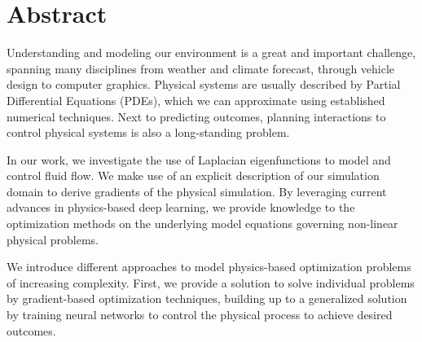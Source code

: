 \chapter*{Abstract}

Understanding and modeling our environment is a great and important challenge,
spanning many disciplines from weather and climate forecast, through vehicle
design to computer graphics. Physical systems are usually described by Partial
Differential Equations (PDEs), which we can approximate using established
numerical techniques. Next to predicting outcomes, planning interactions to
control physical systems is also a long-standing problem.

In our work, we investigate the use of Laplacian eigenfunctions to model and
control fluid flow. We make use of an explicit description of our simulation
domain to derive gradients of the physical simulation. By leveraging current
advances in physics-based deep learning, we provide knowledge to the
optimization methods on the underlying model equations governing non-linear
physical problems.

We introduce different approaches to model physics-based optimization problems
of increasing complexity. First, we provide a solution to solve individual
problems by gradient-based optimization techniques, building up to a generalized
solution by training neural networks to control the physical process to achieve
desired outcomes.

\vfill
\cleardoublepage

\selectthesislanguage

\setcounter{romanPage}{\value{page}}
